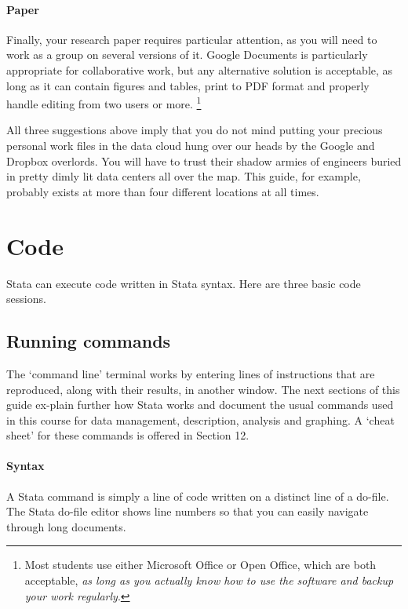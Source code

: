 \paragraph{Paper} %
Finally, your research paper requires particular attention, as you will need to work as a group on several versions of it. Google Documents is particularly appropriate for collaborative work, but any alternative solution is acceptable, as long as it can contain figures and tables, print to PDF format and properly handle editing from two users or more.%
  \footnote{Most students use either Microsoft Office or Open Office, which are both acceptable, \emph{as long as you actually know how to use the software and backup your work regularly}.}%

All three suggestions above imply that you do not mind putting your precious personal work files in the data cloud hung over our heads by the Google and Dropbox overlords. You will have to trust their shadow armies of engineers buried in pretty dimly lit data centers all over the map. This guide, for example, probably exists at more than four different locations at all times.



%
\section{Code}%

Stata can execute code written in Stata syntax. Here are three basic code sessions.


%
%
\subsection{Running commands}%

The ‘command line’ terminal works by entering lines of instructions that are reproduced, along with their results, in another window. The next sections of this guide ex-plain further how Stata works and document the usual commands used in this course for data management, description, analysis and graphing. A ‘cheat sheet’ for these commands is offered in Section 12. %

\paragraph{Syntax}%
%
A Stata command is simply a line of code written on a distinct line of a do-file. The Stata do-file editor shows line numbers so that you can easily navigate through long documents.


